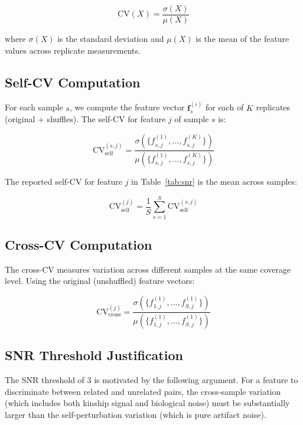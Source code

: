 \documentclass{../yalumba}
\begin{document}
\begin{equation}
  \text{CV}(X) = \frac{\sigma(X)}{\mu(X)}
\end{equation}

where $\sigma(X)$ is the standard deviation and $\mu(X)$ is the mean of the
feature values across replicate measurements.

\subsection{Self-CV Computation}

For each sample $s$, we compute the feature vector $\mathbf{f}_s^{(i)}$ for
each of $K$ replicates (original + shuffles). The self-CV for feature $j$ of
sample $s$ is:

\begin{equation}
  \text{CV}_{\text{self}}^{(s,j)} = \frac{\sigma\left(\{f_{s,j}^{(1)}, \ldots, f_{s,j}^{(K)}\}\right)}
    {\mu\left(\{f_{s,j}^{(1)}, \ldots, f_{s,j}^{(K)}\}\right)}
\end{equation}

The reported self-CV for feature $j$ in Table~\ref{tab:snr} is the mean
across samples:

\begin{equation}
  \text{CV}_{\text{self}}^{(j)} = \frac{1}{S} \sum_{s=1}^{S} \text{CV}_{\text{self}}^{(s,j)}
\end{equation}

\subsection{Cross-CV Computation}

The cross-CV measures variation across different samples at the same coverage
level. Using the original (unshuffled) feature vectors:

\begin{equation}
  \text{CV}_{\text{cross}}^{(j)} = \frac{\sigma\left(\{f_{1,j}^{(1)}, \ldots, f_{S,j}^{(1)}\}\right)}
    {\mu\left(\{f_{1,j}^{(1)}, \ldots, f_{S,j}^{(1)}\}\right)}
\end{equation}

\subsection{SNR Threshold Justification}

The SNR threshold of 3 is motivated by the following argument. For a feature
to discriminate between related and unrelated pairs, the cross-sample variation
(which includes both kinship signal and biological noise) must be substantially
larger than the self-perturbation variation (which is pure artifact noise).
\end{document}
